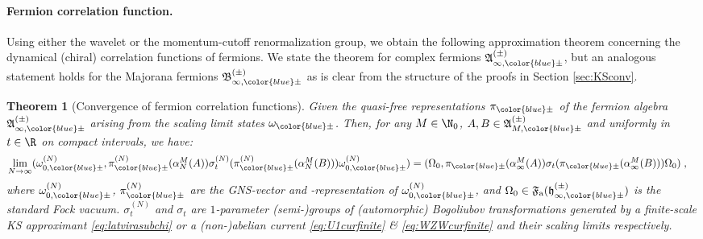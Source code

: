 \documentclass[a4paper, 11pt]{article}
\newcommand{\fA}{\mathfrak{A}}\newcommand{\cA}{\mathcal{A}}\newcommand{\dA}{\mathds{A}}\newcommand{\sA}{\mathscr{A}}
\newcommand{\ua}{\textup a}
\newcommand{\fB}{\mathfrak{B}}\newcommand{\cB}{\mathcal{B}}\newcommand{\dB}{\mathds{B}}\newcommand{\sB}{\mathscr{B}}
\newcommand{\fF}{\mathfrak{F}}\newcommand{\cF}{\mathcal{F}}\newcommand{\dF}{\mathds{F}}\newcommand{\sF}{\mathscr{F}}
\newcommand{\fh}{\mathfrak{h}}
\DeclareMathOperator{\1}{\mathds{1}}
\newtheorem{thm}{Theorem} [section]
\begin{document}
\paragraph{Fermion correlation function.}
Using either the wavelet or the momentum-cutoff renormalization group, we obtain the following approximation theorem concerning the dynamical (chiral) correlation functions of fermions. We state the theorem for complex fermions $\fA^{(\pm)}_{\infty,{\color{blue}\pm}}$, but an analogous statement holds for the Majorana fermions $\fB^{(\pm)}_{\infty,{\color{blue}\pm}}$ as is clear from the structure of the proofs in Section \ref{sec:KSconv}.
\begin{thm}[Convergence of fermion correlation functions]
\label{thm:corapprox}
Given the quasi-free representations $\pi_{{\color{blue}\pm}}$ of the fermion algebra $\fA^{(\pm)}_{\infty,{\color{blue}\pm}}$ arising from the scaling limit states $\omega_{{\color{blue}\pm}}$. Then, for any $M\in\N_{0}$, $A,B\in\fA^{(\pm)}_{M,{\color{blue}\pm}}$ and uniformly in $t\in\R$ on compact intervals, we have:
\begin{align*}
\lim_{N\rightarrow\infty}(\omega^{(N)}_{0,{\color{blue}\pm}},\pi^{(N)}_{{\color{blue}\pm}}(\alpha^{M}_{N}(A))\sigma^{(N)}_{t}(\pi^{(N)}_{{\color{blue}\pm}}(\alpha^{M}_{N}(B)))\omega^{(N)}_{0,{\color{blue}\pm}}) & = (\Omega_{0},\pi_{{\color{blue}\pm}}(\alpha^{M}_{\infty}(A))\sigma_{t}(\pi_{{\color{blue}\pm}}(\alpha^{M}_{\infty}(B)))\Omega_{0})\;,
\end{align*}
where $\omega^{(N)}_{0,{\color{blue}\pm}}$, $\pi^{(N)}_{{\color{blue}\pm}}$ are the GNS-vector and -representation of $\omega^{(N)}_{0,{\color{blue}\pm}}$, and $\Omega_{0}\in\fF_{\ua}(\fh^{(\pm)}_{\infty,{\color{blue}\pm}})$ is the standard Fock vacuum. $\sigma^{(N)}_{t}$ and $\sigma_{t}$ are $1$-parameter (semi-)groups of (automorphic) Bogoliubov transformations generated by a finite-scale KS approximant \eqref{eq:latvirasubchi} or a (non-)abelian current \eqref{eq:U1curfinite} \& \eqref{eq:WZWcurfinite} and their scaling limits respectively.
\end{thm}
\end{document}
